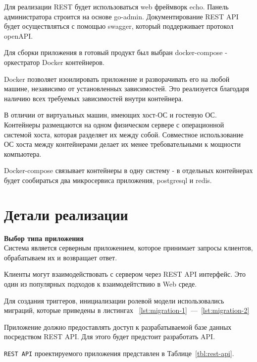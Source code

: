 Для реализации REST будет использоваться web фреймворк echo\cite{web-echo}. Панель администратора строится на основе go-admin\cite{go-admin}. Документирование REST API будет осуществляться с помощью swagger\cite{swagger}, который поддерживает протокол openAPI\cite{openapi}. 

Для сборки приложения в готовый продукт был выбран docker-compose\cite{docker-compose} - оркестратор Docker контейнеров\cite{docker}. 

Docker позволяет изоилировать приложение и разворачивать его на любой машине, независимо от установленных зависимостей. Это реализуется благодаря наличию всех требуемых зависимостей внутри контейнера. 

В отличии от виртуальных машин, имеющих хост-ОС и гостевую ОС. Контейнеры  размещаются на одном физическом сервере с операционной системой хоста, которая разделяет их между собой. Совместное использование ОС хоста между контейнерами делает их менее требовательными к мощности компьютера.

Docker-compose связывает контейнеры в одну систему - в отдельных контейнерах будет сообираться два микросервиса приложения, postgresql и redis. 
 
\section{Детали реализации}

\textbf{Выбор типа приложения}\\
Система является серверным приложением, которое принимает запросы клиентов, обрабатываем их и возвращает ответ.

Клиенты могут взаимодействовать с сервером через REST API интерфейс. Это один из популярных подходов к взаимодейтствию в Web среде. 

Для создания триггеров, инициализации ролевой модели использовались миграций, которые приведены в листингах ~\ref{lst:migration-1}~---~\ref{lst:migration-2}

Приложение должно предоставлять доступ к разрабатываемой базе данных посредством REST API. Для этого будет предстоит разработать API.

\texttt{REST API} проектируемого приложения представлен в Таблице~\ref{tbl:rest-api}.


